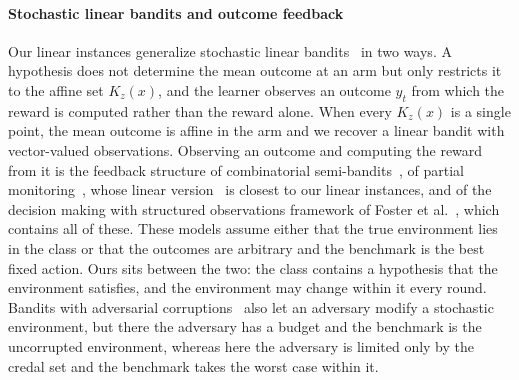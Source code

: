 {\paragraph{Stochastic linear bandits and outcome feedback} Our linear instances generalize stochastic linear bandits~\citep{auer2002using,dani2008stochastic,rusmevichientong2010linearly,abbasi2011improved,chu2011contextual,lattimore2020bandit} in two ways. A hypothesis does not determine the mean outcome at an arm but only restricts it to the affine set $K_{z} \left( x \right)$, and the learner observes an outcome $y_{t}$ from which the reward is computed rather than the reward alone. When every $K_{z} \left( x \right)$ is a single point, the mean outcome is affine in the arm and we recover a linear bandit with vector-valued observations. Observing an outcome and computing the reward from it is the feedback structure of combinatorial semi-bandits~\citep{gyorgy2007online,chen2013combinatorial,kveton2015tight}, of partial monitoring~\citep{rustichini1999minimizing,cesabianchi2006regret,bartok2014partial,lattimore2019information}, whose linear version~\citep{kirschner2020information} is closest to our linear instances, and of the decision making with structured observations framework of Foster et al.~\citep{foster2021statistical}, which contains all of these. These models assume either that the true environment lies in the class or that the outcomes are arbitrary and the benchmark is the best fixed action. Ours sits between the two: the class contains a hypothesis that the environment satisfies, and the environment may change within it every round. Bandits with adversarial corruptions~\citep{lykouris2018stochastic,bogunovic2021stochastic} also let an adversary modify a stochastic environment, but there the adversary has a budget and the benchmark is the uncorrupted environment, whereas here the adversary is limited only by the credal set and the benchmark takes the worst case within it.

}
